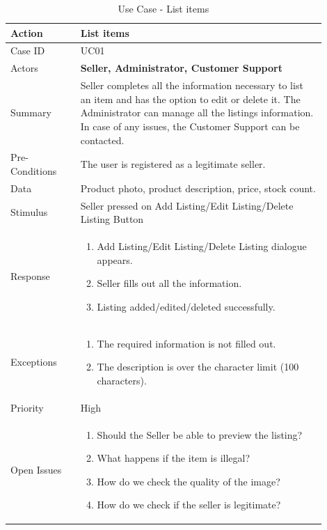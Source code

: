 \documentclass[11pt]{article}
\newcounter{use case ID}
\newcommand\tabularhead[1]{
    \begin{table}[ht]
        \addtocounter{use case ID}{1}
        \caption{Use Case \arabic{use case ID} - #1}
        \vspace{0.2cm}
        \begin{tabular}{|p{0.2\linewidth}|p{0.70\linewidth}|}
            \hline
            \textbf{Action} & \textbf{#1} \\
            \hline}
\newcommand\addrow[2]{#1 & #2\\ \hline}
\newcommand\addmulrow[2]{ \begin{minipage}[t][][t]{2.5cm}#1\end{minipage}
                &\begin{minipage}[t][][t]{11cm}
                    \begin{enumerate}[itemsep=-1ex] #2   \end{enumerate}
                \end{minipage}\vfill\\ \hline}
\newenvironment{usecase}{\tabularhead}
        {\hline\end{tabular}\end{table}}
\newcounter{req ID}
\begin{document}
\begin{usecase}{List items}
    \addrow{Case ID}{UC01}
    \addrow{Actors}{\textbf{Seller, Administrator, Customer Support}}
    \addrow{Summary}{\index{seller}Seller completes all the \index{information}information necessary to list an item and has the option to edit or delete it. The \index{administrator}Administrator can manage all the listings information. In case of any issues, the Customer Support can be contacted.}
    \addrow{Pre-Conditions}{The user is registered as a legitimate seller.}
    \addrow{\index{data}Data}{Product photo, \index{product}product description, price, stock count.}
    \addrow{Stimulus}{Seller pressed on Add Listing/Edit Listing/Delete Listing Button}
    \addmulrow{Response}{
            \item Add Listing/Edit Listing/Delete Listing dialogue appears.
            \item \index{seller}Seller fills out all the information.
            \item Listing added/edited/deleted successfully.
    }
    \addmulrow{Exceptions}{
            \item The required information is not filled out.
            \item The description is over the character limit (100 characters).
    }
    \addrow{Priority}{High}
    \addmulrow{Open Issues}{
            \item Should the \index{seller}Seller be able to preview the listing?
            \item What happens if the item is illegal?
            \item How do we check the quality of the image?
            \item How do we check if the seller is legitimate?
    }
\end{usecase}
\end{document}
